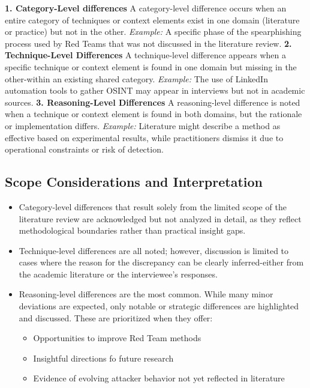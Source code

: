 \textbf{1. Category-Level differences}
A category-level difference occurs when an entire category of techniques or context elements exist in one domain (literature or practice) but not in the other.
\textit{Example:} A specific phase of the spearphishing process used by Red Teams that was not discussed in the literature review.
\textbf{2. Technique-Level Differences}
A technique-level difference appears when a specific technique or context element is found in one domain but missing in the other-within an existing shared category.
\textit{Example:} The use of LinkedIn automation tools to gather OSINT may appear in interviews but not in academic sources.
\textbf{3. Reasoning-Level Differences}
A reasoning-level difference is noted when a technique or context element is found in both domains, but the rationale or implementation differs.
\textit{Example:} Literature might describe a method as effective based on experimental results, while practitioners dismiss it due to operational constraints or risk of detection.

\subsection{Scope Considerations and Interpretation}
\begin{itemize}
    \item Category-level differences that result solely from the limited scope of the literature review are acknowledged but not analyzed in detail, as they reflect methodological boundaries rather than practical insight gaps.
    \item Technique-level differences are all noted; however, discussion is limited to cases where the reason for the discrepancy can be clearly inferred-either from the academic literature or the interviewee's responses.
    \item Reasoning-level differences are the most common. While many minor deviations are expected, only notable or strategic differences are highlighted and discussed. These are prioritized when they offer:
    \begin{itemize}
        \item Opportunities to improve Red Team methods
        \item Insightful directions fo future research
        \item Evidence of evolving attacker behavior not yet reflected in literature
    \end{itemize}
\end{itemize}

